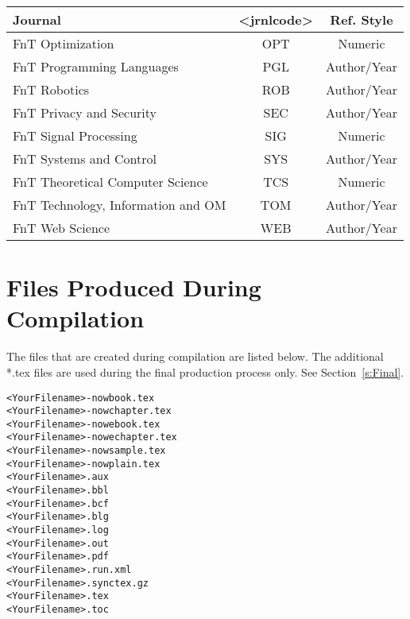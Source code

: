 \documentclass[examplefnt,biber]{nowfnt} %
\begin{document}
\begin{table}[t!]
\begin{tabular}{lcc}
{\textbf Journal} & {\textbf <jrnlcode> } & {\textbf Ref. Style }\\
\hline
\small
FnT Optimization & OPT & Numeric \\
\small
FnT Programming Languages & PGL & Author/Year \\
\small
FnT Robotics & ROB & Author/Year \\
\small
FnT Privacy and Security & SEC & Author/Year \\
\small
FnT Signal Processing & SIG & Numeric \\
\small
FnT Systems and Control & SYS & Author/Year \\
\small
FnT Theoretical Computer Science & TCS & Numeric \\
\small
FnT Technology, Information and OM & TOM & Author/Year \\
\small
FnT Web Science & WEB & Author/Year \\
\end{tabular}
\end{table}

\chapter{Files Produced During Compilation}\label{App:filelist}
\vspace*{-1.8in}
The files that are created during compilation are listed below. The 
additional *.tex files are used during the final production process only.
See Section~\ref{s:Final}.
\begin{verbatim}
<YourFilename>-nowbook.tex                                                
<YourFilename>-nowchapter.tex                                             
<YourFilename>-nowebook.tex                                               
<YourFilename>-nowechapter.tex                                            
<YourFilename>-nowsample.tex 
<YourFilename>-nowplain.tex                                             
<YourFilename>.aux                                                        
<YourFilename>.bbl                                                        
<YourFilename>.bcf                                                        
<YourFilename>.blg                                                        
<YourFilename>.log                                                        
<YourFilename>.out                                                        
<YourFilename>.pdf                                                        
<YourFilename>.run.xml                                                    
<YourFilename>.synctex.gz                                                 
<YourFilename>.tex                                                        
<YourFilename>.toc                                                                 
\end{verbatim}

\backmatter  %

\printbibliography
\end{document}
